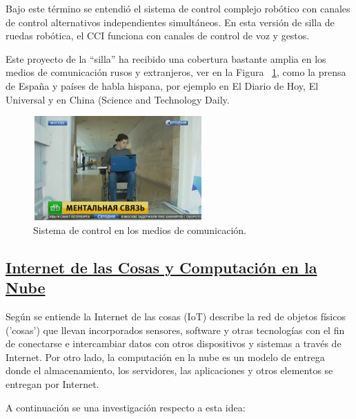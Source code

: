 \documentclass[10pt,journal]{IEEEtran}
\begin{document}
\begin{itemize}
    Bajo este término se entendió el sistema de control complejo robótico con canales de control alternativos independientes simultáneos. En esta versión de silla de ruedas robótica, el CCI funciona con canales de control de voz y gestos.
    
    Este proyecto de la “silla” ha recibido una cobertura bastante amplia en los medios de comunicación rusos y extranjeros, ver en la Figura ~\ref{f3}, como la prensa de España y países de habla hispana, por ejemplo en El Diario de Hoy, El Universal y en China (Science and Technology Daily.
    
    \begin{figure}[H]
        \begin{center}
        \includegraphics[width=6.5cm, height=4cm]{figuras/silla.PNG}
        \caption{Sistema de control en los medios de comunicación.}
        \label{f3} 
        \end{center}
    \end{figure}
    \end{itemize}
    
    \subsection{\underline{\textbf{Internet de las Cosas y Computación en la Nube}}}
    Según se entiende la Internet de las cosas (IoT) describe la red de objetos físicos ('cosas') que llevan incorporados sensores, software y otras tecnologías con el fin de conectarse e intercambiar datos con otros dispositivos y sistemas a través de Internet. Por otro lado, la computación en la nube es un modelo de entrega donde el almacenamiento, los servidores, las aplicaciones y otros elementos se entregan por Internet. 
    
    A continuación se una investigación respecto a esta idea:
    
\end{document}
